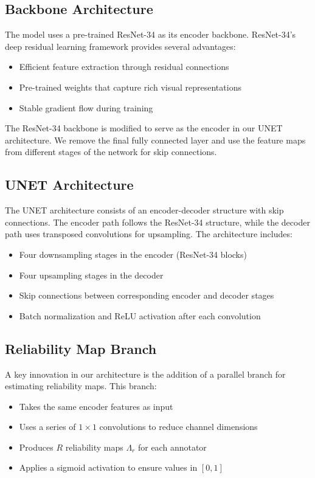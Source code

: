 \subsection{Backbone Architecture}

The model uses a pre-trained ResNet-34 as its encoder backbone.
ResNet-34's deep residual learning framework provides several advantages:

\begin{itemize}
  \item Efficient feature extraction through residual connections
  \item Pre-trained weights that capture rich visual representations
  \item Stable gradient flow during training
\end{itemize}

The ResNet-34 backbone is modified to serve as the encoder in our
UNET architecture. We remove the final fully connected layer and use
the feature maps from different stages of the network for skip connections.

\subsection{UNET Architecture}

The UNET architecture consists of an encoder-decoder structure with
skip connections. The encoder path follows the ResNet-34 structure,
while the decoder path uses transposed convolutions for upsampling.
The architecture includes:

\begin{itemize}
  \item Four downsampling stages in the encoder (ResNet-34 blocks)
  \item Four upsampling stages in the decoder
  \item Skip connections between corresponding encoder and decoder stages
  \item Batch normalization and ReLU activation after each convolution
\end{itemize}

\subsection{Reliability Map Branch}

A key innovation in our architecture is the addition of a parallel
branch for estimating reliability maps. This branch:

\begin{itemize}
  \item Takes the same encoder features as input
  \item Uses a series of $1 \times 1$ convolutions to reduce channel dimensions
  \item Produces $R$ reliability maps $\Lambda_r$ for each annotator
  \item Applies a sigmoid activation to ensure values in $[0,1]$
\end{itemize}

